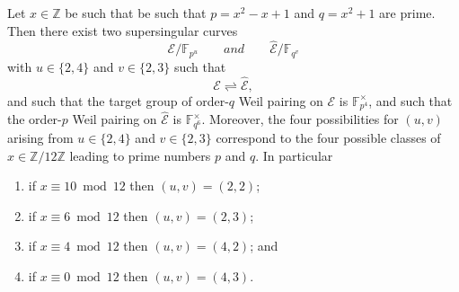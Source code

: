 \documentclass[version=preprint]{iacrcc}
\newcommand{\Z}{\mathbb{Z}}
\newcommand{\F}{\mathbb{F}}
\newcommand{\EC}{\mathcal{E}}
\begin{document}
\begin{theorem}\label{thm:main}
Let $x \in \Z$ be such that be such that $p = x^2-x+1$ and $q=x^2+1$ are prime. Then there exist two supersingular curves 
\[\EC/\F_{p^u} \quad\quad { and} \quad\quad \hat{\EC}/\F_{q^v}\]
with $u \in \{2,4\}$ and $v \in \{2,3\}$ such that
\[\EC \rightleftharpoons \hat{\EC},\]
and such that the target group of order-$q$ Weil pairing on $\EC$ is $\F_{p^4}^\times$, and such that the order-$p$ Weil pairing on $\hat{\EC}$ is $\F_{q^6}^\times$.  
%
Moreover, the four possibilities for $(u,v)$ arising from $u \in \{2,4\}$ and $v \in \{2,3\}$ correspond to the four possible classes of $x \in \Z/12\Z$ leading to prime numbers $p$ and $q$. In particular
\begin{enumerate}
\item if $x\equiv 10\bmod {12}$ then $(u,v) = (2,2)$; 
\item if $x\equiv 6\bmod {12}$ then $(u,v) = (2,3)$;
\item if $x\equiv 4\bmod {12}$ then $(u,v) = (4,2)$; and 
\item if $x\equiv 0\bmod {12}$ then $(u,v) = (4,3)$.
\end{enumerate}
 
\end{theorem}
\end{document}
